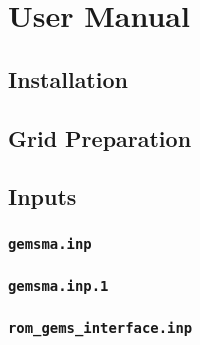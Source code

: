 \section{User Manual}

\subsection{Installation}

\subsection{Grid Preparation}

\subsection{Inputs}

\subsubsection{\texttt{gemsma.inp}}

\subsubsection{\texttt{gemsma.inp.1}}

\subsubsection{\texttt{rom\_gems\_interface.inp}}

